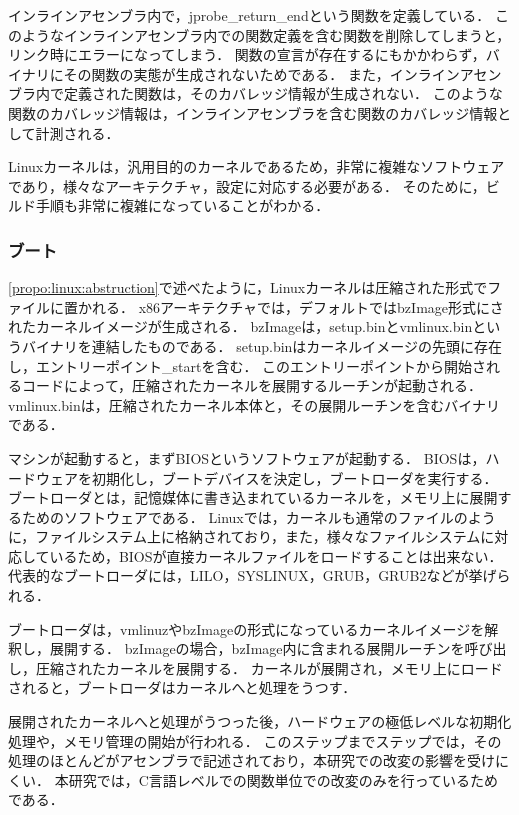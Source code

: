 \documentclass[graduation-thesis]{mlarticle}
\begin{document}
インラインアセンブラ内で，jprobe\_return\_endという関数を定義している．
このようなインラインアセンブラ内での関数定義を含む関数を削除してしまうと，リンク時にエラーになってしまう．
関数の宣言が存在するにもかかわらず，バイナリにその関数の実態が生成されないためである．
また，インラインアセンブラ内で定義された関数は，そのカバレッジ情報が生成されない．
このような関数のカバレッジ情報は，インラインアセンブラを含む関数のカバレッジ情報として計測される．

Linuxカーネルは，汎用目的のカーネルであるため，非常に複雑なソフトウェアであり，様々なアーキテクチャ，設定に対応する必要がある．
そのために，ビルド手順も非常に複雑になっていることがわかる．

\subsubsection{ブート}
\label{propo:linux:boot}

\ref{propo:linux:abstruction}で述べたように，Linuxカーネルは圧縮された形式でファイルに置かれる．
x86アーキテクチャでは，デフォルトではbzImage形式にされたカーネルイメージが生成される．
bzImageは，setup.binとvmlinux.binというバイナリを連結したものである．
setup.binはカーネルイメージの先頭に存在し，エントリーポイント\_startを含む．
このエントリーポイントから開始されるコードによって，圧縮されたカーネルを展開するルーチンが起動される．
vmlinux.binは，圧縮されたカーネル本体と，その展開ルーチンを含むバイナリである．

マシンが起動すると，まずBIOSというソフトウェアが起動する．
BIOSは，ハードウェアを初期化し，ブートデバイスを決定し，ブートローダを実行する．
ブートローダとは，記憶媒体に書き込まれているカーネルを，メモリ上に展開するためのソフトウェアである．
Linuxでは，カーネルも通常のファイルのように，ファイルシステム上に格納されており，また，様々なファイルシステムに対応しているため，BIOSが直接カーネルファイルをロードすることは出来ない．
代表的なブートローダには，LILO，SYSLINUX，GRUB，GRUB2などが挙げられる．

ブートローダは，vmlinuzやbzImageの形式になっているカーネルイメージを解釈し，展開する．
bzImageの場合，bzImage内に含まれる展開ルーチンを呼び出し，圧縮されたカーネルを展開する．
カーネルが展開され，メモリ上にロードされると，ブートローダはカーネルへと処理をうつす．

展開されたカーネルへと処理がうつった後，ハードウェアの極低レベルな初期化処理や，メモリ管理の開始が行われる．
このステップまでステップでは，その処理のほとんどがアセンブラで記述されており，本研究での改変の影響を受けにくい．
本研究では，C言語レベルでの関数単位での改変のみを行っているためである．
\end{document}
